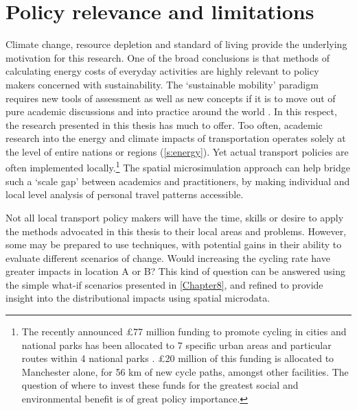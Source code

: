 \documentclass[a4paper, 11pt, twoside]{Thesis}
\begin{document}
\section{Policy relevance and limitations} \label{sprel}
Climate change, resource depletion and standard of living provide the underlying
motivation for this research. One of the broad conclusions is that
methods of calculating energy costs of everyday activities are
highly relevant to policy makers concerned with sustainability. The
`sustainable mobility' paradigm requires new tools of assessment
as well as new concepts if it is to move out of pure academic discussions and
into practice around the world \citep{Banister2008}. In this respect, the
research presented in this thesis has much to offer. Too often, academic
research into the energy and climate impacts of transportation operates solely
at the level of entire nations or regions (\cref{s:energy}). Yet actual
transport
policies are often implemented locally.\footnote{The recently announced
\pounds77 million funding to promote cycling in cities and
national parks has been allocated to 7 specific urban areas and particular
routes within 4 national parks
\citep{RimeMinister'sOfficea}. \pounds 20 million of this funding is
allocated to Manchester alone, for 56 km of new cycle paths, amongst other
facilities. The question of where to invest these funds for the greatest social
and environmental benefit is of great policy importance.
}
The spatial microsimulation approach can help bridge such a `scale gap'
between academics and practitioners, by making individual and local level
analysis of personal travel patterns accessible.

Not all local transport policy makers will have the time, skills or
desire to apply the methods advocated in this thesis to their local areas
and problems. However, some may be prepared to use techniques, with potential gains
in their ability to evaluate different scenarios of change. Would
increasing the cycling rate have greater impacts in location A or B? This kind
of question can be answered using the simple what-if scenarios presented in
\cref{Chapter8}, and refined to provide insight into the distributional impacts
using spatial microdata.
\end{document}
